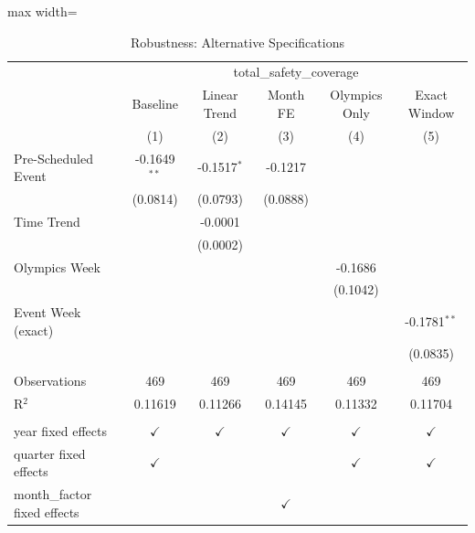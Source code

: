 
\begin{table}[htbp]
   \caption{\label{tab:robustness} Robustness: Alternative Specifications}
   \bigskip
   \centering
   \begin{adjustbox}{max width=\textwidth}
   \begin{tabular}{lccccc}
      \toprule
       & \multicolumn{5}{c}{total\_safety\_coverage}\\
                                   & Baseline       & Linear Trend  & Month FE      & Olympics Only & Exact Window \\   
                                   & (1)            & (2)           & (3)           & (4)           & (5)\\  
      \midrule 
      Pre-Scheduled Event          & -0.1649$^{**}$ & -0.1517$^{*}$ & -0.1217       &               &   \\   
                                   & (0.0814)       & (0.0793)      & (0.0888)      &               &   \\   
      Time Trend                   &                & -0.0001       &               &               &   \\   
                                   &                & (0.0002)      &               &               &   \\   
      Olympics Week                &                &               &               & -0.1686       &   \\   
                                   &                &               &               & (0.1042)      &   \\   
      Event Week (exact)           &                &               &               &               & -0.1781$^{**}$\\   
                                   &                &               &               &               & (0.0835)\\   
       \\
      Observations                 & 469            & 469           & 469           & 469           & 469\\  
      R$^2$                        & 0.11619        & 0.11266       & 0.14145       & 0.11332       & 0.11704\\  
       \\
      year fixed effects           & $\checkmark$   & $\checkmark$  & $\checkmark$  & $\checkmark$  & $\checkmark$\\   
      quarter fixed effects        & $\checkmark$   &               &               & $\checkmark$  & $\checkmark$\\   
      month\_factor fixed effects  &                &               & $\checkmark$  &               & \\  
      \bottomrule
   \end{tabular}
   \end{adjustbox}


\end{table}
